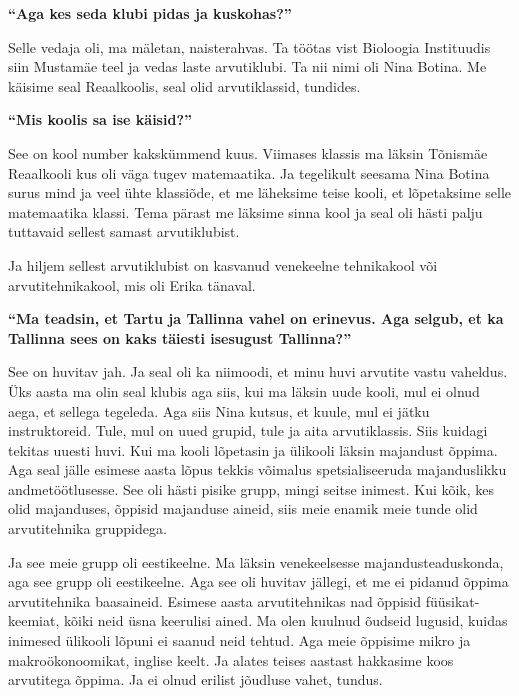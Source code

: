 \textbf{\enquote{Aga kes seda klubi pidas ja kuskohas?}}

Selle vedaja oli, ma mäletan, naisterahvas. Ta töötas vist Bioloogia
Instituudis siin Mustamäe teel ja vedas laste arvutiklubi. Ta nii nimi oli
Nina Botina. Me käisime seal
Reaalkoolis,
seal olid arvutiklassid, tundides.

\textbf{\enquote{Mis koolis sa ise käisid?}}

See on kool number kakskümmend kuus. 
Viimases klassis ma läksin Tõnismäe Reaalkooli 
kus oli väga tugev matemaatika. Ja tegelikult seesama Nina Botina surus mind ja 
veel ühte klassiõde, et me läheksime teise kooli, et lõpetaksime selle 
matemaatika klassi. Tema pärast me läksime sinna kool ja seal oli hästi palju  
tuttavaid sellest samast arvutiklubist.

Ja hiljem sellest arvutiklubist on kasvanud venekeelne tehnikakool või
arvutitehnikakool, mis oli Erika tänaval. 

\textbf{\enquote{Ma teadsin, et Tartu ja Tallinna vahel on erinevus. Aga 
selgub, et ka Tallinna sees on kaks täiesti isesugust Tallinna?}}

See on huvitav jah. Ja seal oli ka niimoodi, et minu huvi arvutite vastu 
vaheldus. Üks aasta ma olin seal klubis aga siis, kui ma läksin uude kooli, mul 
ei olnud aega, et  sellega tegeleda. Aga siis Nina kutsus, et kuule,  mul ei 
jätku instruktoreid. Tule, mul on uued grupid, tule ja aita 
arvutiklassis. Siis kuidagi  tekitas uuesti huvi. Kui ma kooli lõpetasin ja  
ülikooli läksin majandust õppima. Aga seal jälle  esimese aasta lõpus tekkis 
võimalus spetsialiseeruda majanduslikku andmetöötlusesse. See oli hästi pisike 
grupp, mingi seitse inimest. Kui kõik, kes olid majanduses, õppisid majanduse 
aineid, siis meie enamik meie tunde olid  arvutitehnika gruppidega.

Ja see meie grupp oli eestikeelne. Ma läksin venekeelsesse majandusteaduskonda, 
aga see grupp oli eestikeelne. Aga
see oli huvitav jällegi, et me ei pidanud õppima arvutitehnika baasaineid. 
Esimese aasta arvutitehnikas nad õppisid füüsikat-keemiat, kõiki neid üsna 
keerulisi ained. Ma olen kuulnud õudseid lugusid, kuidas inimesed ülikooli 
lõpuni ei saanud neid tehtud. Aga meie õppisime mikro ja makroökonoomikat, 
inglise keelt. Ja alates teises aastast hakkasime koos arvutitega õppima. Ja ei 
olnud erilist jõudluse vahet, tundus.

